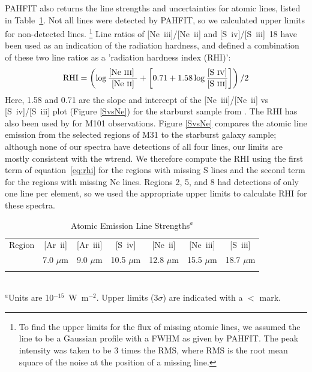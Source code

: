 PAHFIT also returns the line strengths and uncertainties for atomic lines, listed in Table~\ref{Atomic}.
Not all lines were detected by PAHFIT, so we calculated upper limits for non-detected lines.%
\footnote{To find  the upper limits for the flux of missing atomic lines, we assumed the line to be a 
Gaussian profile with a FWHM as given by PAHFIT. The peak intensity was taken to be 3 times the RMS, where RMS is the root mean square of 
the noise at the position of a missing line.}
Line ratios of [Ne~{\sc iii}]/[Ne~{\sc ii}] and [S~{\sc iv}]/[S~{\sc iii}]~18 have been used as an indication of the radiation hardness, and
\citet{Engelbracht_2008} defined a combination of these two line ratios as a 'radiation hardness index (RHI)':
%
\begin{equation}
{\rm RHI} = \left( \log\frac{\textrm{[Ne~{\sc iii}] }}{\textrm{[Ne~{\sc ii}]}} + \left[0.71 + 1.58\log\frac{\textrm{{[S~{\sc iv}]}}}{\textrm{{[S~{\sc iii}]}}}\right]\right) /2
\end{equation}
\label{eq:rhi}
%
Here, 1.58 and 0.71 are the slope and intercept of the [Ne~{\sc iii}]/[Ne~{\sc ii}]  vs [S~{\sc iv}]/[S~{\sc iii}] plot (Figure \ref{SvsNe}) for the starburst sample from 
\citet{Engelbracht_2008}. The RHI has also been used by \citet{Gordon:2008lr} for M101 observations. 
Figure \ref{SvsNe}  compares the atomic line emission from the selected regions of M31 to the starburst galaxy sample;
although none of our spectra have detections of all four lines, our limits are mostly consistent with the wtrend.
We therefore compute the RHI using the first term of equation~\ref{eq:rhi} for the regions with missing S lines
and the second term for the regions with missing Ne lines.
Regions 2, 5, and 8 had detections of only one line per element, so we used the appropriate upper limits 
to calculate RHI for these spectra.


\begin{table}
 \centering
 \begin{minipage}{100mm}
\caption{Atomic Emission Line Strengths$^a$}
  \begin{tabular}{l c c  c  c  c  c  }
  \hline
  {Region  }&{[Ar~{\sc ii}] }&{[Ar~{\sc iii}]  }&{[S~{\sc iv}]}&{[Ne~{\sc ii}]   }&{[Ne~{\sc iii}]   }&{[S~{\sc iii}]  }\\
{}&{\tiny{7.0 $\mu$m} }&{\tiny{9.0 $\mu$m }}&{\tiny{10.5 $\mu$m}}&{\tiny{12.8 $\mu$m  }}&{\tiny{15.5 $\mu$m } }&{\tiny{18.7 $\mu$m }} \\
 \hline 
  
\hline
 \label{Atomic}
\end{tabular}\\
{ $^a$Units are 10$^{-15}$~W~m$^{-2}$. Upper limits ($3\sigma$) are indicated with a $<$ mark.  }
\end{minipage}
\end{table}

